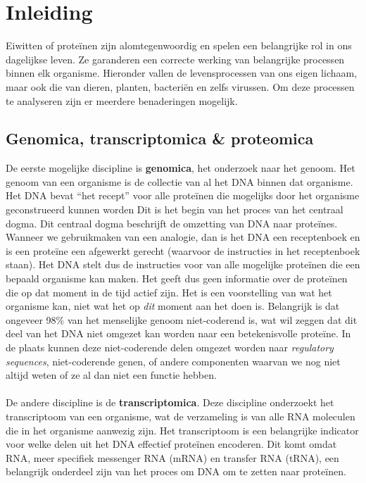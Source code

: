 \chapter{Inleiding}\label{ch:introductie}

Eiwitten of proteïnen zijn alomtegenwoordig en spelen een belangrijke rol in ons dagelijkse leven.
Ze garanderen een correcte werking van belangrijke processen binnen elk organisme.
Hieronder vallen de levensprocessen van ons eigen lichaam, maar ook die van dieren, planten, bacteriën en zelfs virussen.
Om deze processen te analyseren zijn er meerdere benaderingen mogelijk.


\section{Genomica, transcriptomica \& proteomica}\label{sec:genomica-transcriptomica-&-proteomica}
De eerste mogelijke discipline is \textbf{genomica}, het onderzoek naar het genoom.
Het genoom van een organisme is de collectie van al het DNA binnen dat organisme.
Het DNA bevat ``het recept'' voor alle proteïnen die mogelijks door het organisme geconstrueerd kunnen worden
Dit is het begin van het proces van het centraal dogma.
Dit centraal dogma beschrijft de omzetting van DNA naar proteïnes.
Wanneer we gebruikmaken van een analogie, dan is het DNA een receptenboek en is een proteïne een afgewerkt gerecht (waarvoor de instructies in het receptenboek staan).
Het DNA stelt dus de instructies voor van alle mogelijke proteïnen die een bepaald organisme kan maken.
Het geeft dus geen informatie over de proteïnen die op dat moment in de tijd actief zijn.
Het is een voorstelling van wat het organisme kan, niet wat het op \textit{dit} moment aan het doen is.
Belangrijk is dat ongeveer 98\% van het menselijke genoom niet-coderend is, wat wil zeggen dat dit deel van het DNA niet omgezet kan worden naar een betekenisvolle proteïne.
In de plaats kunnen deze niet-coderende delen omgezet worden naar \textit{regulatory sequences}, niet-coderende genen, of andere componenten waarvan we nog niet altijd weten of ze al dan niet een functie hebben.
\\ \\
De andere discipline is de \textbf{transcriptomica}.
Deze discipline onderzoekt het transcriptoom van een organisme, wat de verzameling is van alle RNA moleculen die in het organisme aanwezig zijn.
Het transcriptoom is een belangrijke indicator voor welke delen uit het DNA effectief proteïnen encoderen.
Dit komt omdat RNA, meer specifiek messenger RNA (mRNA) en transfer RNA (tRNA), een belangrijk onderdeel zijn van het proces om DNA om te zetten naar proteïnen.
